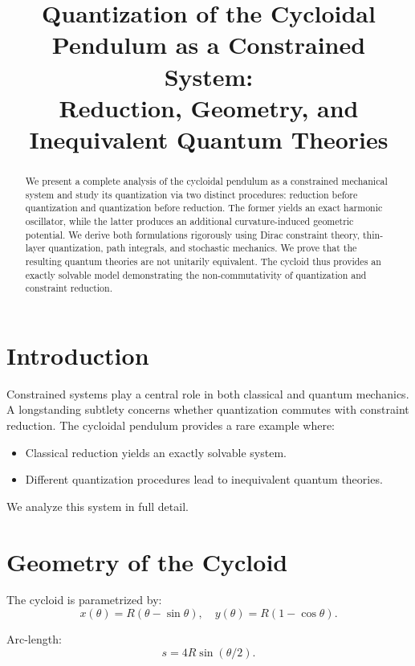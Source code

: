\documentclass[11pt]{article}
\title{Quantization of the Cycloidal Pendulum as a Constrained System:\\
Reduction, Geometry, and Inequivalent Quantum Theories}
\author{}
\date{}
\begin{document}
\maketitle

\begin{abstract}
We present a complete analysis of the cycloidal pendulum as a constrained mechanical system and study its quantization via two distinct procedures: reduction before quantization and quantization before reduction. The former yields an exact harmonic oscillator, while the latter produces an additional curvature-induced geometric potential. We derive both formulations rigorously using Dirac constraint theory, thin-layer quantization, path integrals, and stochastic mechanics. We prove that the resulting quantum theories are not unitarily equivalent. The cycloid thus provides an exactly solvable model demonstrating the non-commutativity of quantization and constraint reduction.
\end{abstract}

\tableofcontents

\section{Introduction}

Constrained systems play a central role in both classical and quantum mechanics. A longstanding subtlety concerns whether quantization commutes with constraint reduction. The cycloidal pendulum provides a rare example where:

\begin{itemize}
\item Classical reduction yields an exactly solvable system.
\item Different quantization procedures lead to inequivalent quantum theories.
\end{itemize}

We analyze this system in full detail.

\section{Geometry of the Cycloid}

The cycloid is parametrized by:
\begin{equation}
x(\theta)=R(\theta-\sin\theta), \quad y(\theta)=R(1-\cos\theta).
\end{equation}

Arc-length:
\begin{equation}
s = 4R \sin(\theta/2).
\end{equation}
\end{document}
